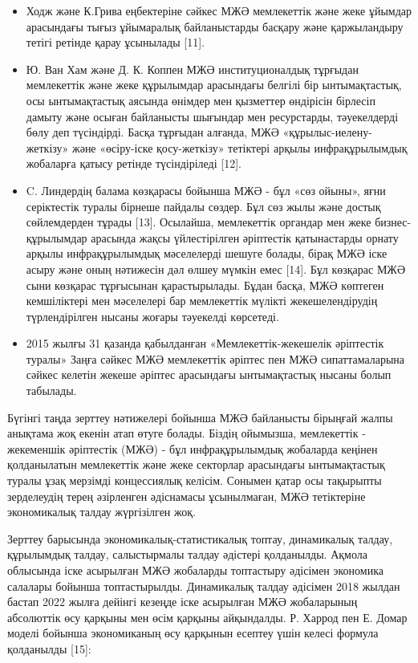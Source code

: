 \begin{multicols}{2}
\begin{itemize}
\item
  Ходж және К.Грива еңбектеріне сәйкес МЖӘ мемлекеттік және жеке ұйымдар
  арасындағы тығыз ұйымаралық байланыстарды басқару және қаржыландыру
  тетігі ретінде қарау ұсынылады {[}11{]}.
\item
  Ю. Ван Хам және Д. К. Коппен МЖӘ институционалдық тұрғыдан мемлекеттік
  және жеке құрылымдар арасындағы белгілі бір ынтымақтастық, осы
  ынтымақтастық аясында өнімдер мен қызметтер өндірісін бірлесіп дамыту
  және осыған байланысты шығындар мен ресурстарды, тәуекелдерді бөлу деп
  түсіндірді. Басқа тұрғыдан алғанда, МЖӘ «құрылыс-иелену-жеткізу» және
  «өсіру-іске қосу-жеткізу» тетіктері арқылы инфрақұрылымдық жобаларға
  қатысу ретінде түсіндіріледі {[}12{]}.
\item
  C. Линдердің балама көзқарасы бойынша МЖӘ - бұл «сөз ойыны», яғни
  серіктестік туралы бірнеше пайдалы сөздер. Бұл сөз жылы және достық
  сөйлемдерден тұрады {[}13{]}. Осылайша, мемлекеттік органдар мен жеке
  бизнес-құрылымдар арасында жақсы үйлестірілген әріптестік қатынастарды
  орнату арқылы инфрақұрылымдық мәселелерді шешуге болады, бірақ МЖӘ
  іске асыру және оның нәтижесін дәл өлшеу мүмкін емес {[}14{]}. Бұл
  көзқарас МЖӘ сыни көзқарас тұрғысынан қарастырылады. Бұдан басқа, МЖӘ
  көптеген кемшіліктері мен мәселелері бар мемлекеттік мүлікті
  жекешелендірудің түрлендірілген нысаны жоғары тәуекелді көрсетеді.
\item
  2015 жылғы 31 қазанда қабылданған «Мемлекеттік-жекешелік әріптестік
  туралы» Заңға сәйкес МЖӘ мемлекеттік әріптес пен МЖӘ сипаттамаларына
  сәйкес келетін жекеше әріптес арасындағы ынтымақтастық нысаны болып
  табылады.
\end{itemize}

Бүгінгі таңда зерттеу нәтижелері бойынша МЖӘ байланысты бірыңғай жалпы
анықтама жоқ екенін атап өтуге болады. Біздің ойымызша, мемлекеттік -
жекеменшік әріптестік (МЖӘ) - бұл инфрақұрылымдық жобаларда кеңінен
қолданылатын мемлекеттік және жеке секторлар арасындағы ынтымақтастық
туралы ұзақ мерзімді концессиялық келісім. Сонымен қатар осы тақырыпты
зерделеудің терең әзірленген әдіснамасы ұсынылмаған, МЖӘ тетіктеріне
экономикалық талдау жүргізілген жоқ.

Зерттеу барысында экономикалық-статистикалық топтау, динамикалық талдау,
құрылымдық талдау, салыстырмалы талдау әдістері қолданылды. Ақмола
облысында іске асырылған МЖӘ жобаларды топтастыру әдісімен экономика
салалары бойынша топтастырылды. Динамикалық талдау әдісімен 2018 жылдан
бастап 2022 жылға дейінгі кезеңде іске асырылған МЖӘ жобаларының
абсолюттік өсу қарқыны мен өсім қарқыны айқындалды. Р. Харрод пен Е.
Домар моделі бойынша экономиканың өсу қарқынын есептеу үшін келесі
формула қолданылды {[}15{]}:


\end{multicols}
